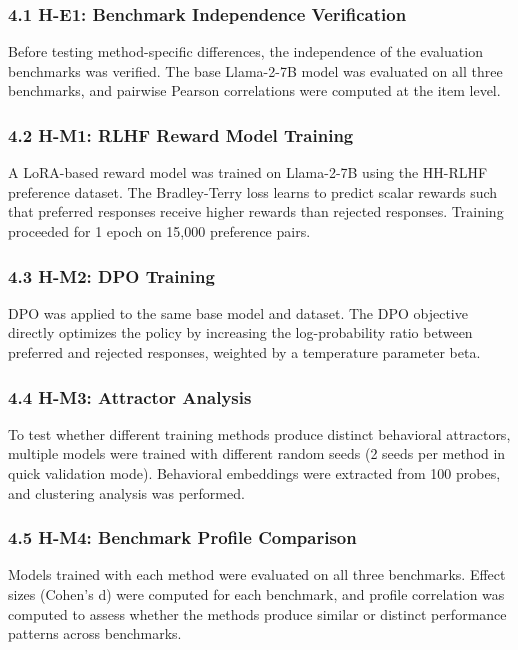 
\subsubsection{4.1 H-E1: Benchmark Independence Verification}

Before testing method-specific differences, the independence of the evaluation benchmarks was verified. The base Llama-2-7B model was evaluated on all three benchmarks, and pairwise Pearson correlations were computed at the item level.

\subsubsection{4.2 H-M1: RLHF Reward Model Training}

A LoRA-based reward model was trained on Llama-2-7B using the HH-RLHF preference dataset. The Bradley-Terry loss learns to predict scalar rewards such that preferred responses receive higher rewards than rejected responses. Training proceeded for 1 epoch on 15,000 preference pairs.

\subsubsection{4.3 H-M2: DPO Training}

DPO was applied to the same base model and dataset. The DPO objective directly optimizes the policy by increasing the log-probability ratio between preferred and rejected responses, weighted by a temperature parameter beta.

\subsubsection{4.4 H-M3: Attractor Analysis}

To test whether different training methods produce distinct behavioral attractors, multiple models were trained with different random seeds (2 seeds per method in quick validation mode). Behavioral embeddings were extracted from 100 probes, and clustering analysis was performed.

\subsubsection{4.5 H-M4: Benchmark Profile Comparison}

Models trained with each method were evaluated on all three benchmarks. Effect sizes (Cohen's d) were computed for each benchmark, and profile correlation was computed to assess whether the methods produce similar or distinct performance patterns across benchmarks.

